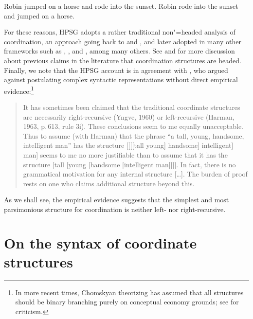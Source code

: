 {\begin{exe}
\ex
\begin{xlista}
\ex Robin jumped on a horse and rode into the sunset.
\ex Robin rode into the sunset and jumped on a horse.
\end{xlista}
\end{exe}

For these reasons, HPSG adopts a rather traditional non"=headed analysis of coordination, an approach  going back
to \citet[195]{bloom} and  \citet[Section~4.2]{ross67}, and later adopted in many other frameworks
such as \citet[Section~3.1]{pesetsky}, \citet[]{gazdarc}, and \citet[1275]{rodney}, among many others. 
See \citet{borsley94,Borsley2005a}
and 
\citet[Chapter~2]{chavesthesis} for more discussion about previous claims in the literature that coordination structures are headed.
Finally, we note that the HPSG account is in agreement with \citet[196]{chom65}, who argued against postulating complex syntactic representations without direct empirical evidence:\footnote{In more recent times, Chomskyan theorizing has assumed that all structures should be binary branching purely on conceptual economy grounds; see \citet{Johnson:Lappin:99} for criticism.}

\begin{quote}
It has sometimes been claimed that the traditional coordinate structures are necessarily right-recursive (Yngve, 1960) or left-recursive (Harman, 1963, p.\,613, rule 3i). These conclusions seem to me equally unacceptable. Thus to assume (with Harman) that the phrase “a tall, young, handsome, intelligent man” has the structure [[[[tall young] handsome] intelligent] man] seems to me no more justifiable than to assume that it has
the structure [tall [young [handsome [intelligent man]]]]. In fact, there is no grammatical
motivation for any internal structure [\ldots]. The burden of proof rests on one who claims additional
structure beyond this. \citep[196--197]{chom65}
\end{quote}

\noindent
As we shall see, the empirical evidence suggests that
the simplest and most parsimonious structure for coordination is neither left- nor right-recursive.


\section{On the syntax of coordinate structures}

}

